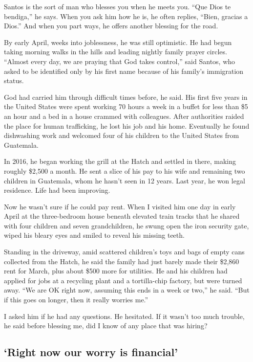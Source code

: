 Santos is the sort of man who blesses you when he meets you. ``Que Dios
te bendiga,'' he says. When you ask him how he is, he often replies,
``Bien, gracias a Dios.'' And when you part ways, he offers another
blessing for the road.

By early April, weeks into joblessness, he was still optimistic. He had
begun taking morning walks in the hills and leading nightly family
prayer circles. ``Almost every day, we are praying that God takes
control,'' said Santos, who asked to be identified only by his first
name because of his family's immigration status.

God had carried him through difficult times before, he said. His first
five years in the United States were spent working 70 hours a week in a
buffet for less than \$5 an hour and a bed in a house crammed with
colleagues. After authorities raided the place for human trafficking, he
lost his job and his home. Eventually he found dishwashing work and
welcomed four of his children to the United States from Guatemala.

In 2016, he began working the grill at the Hatch and settled in there,
making roughly \$2,500 a month. He sent a slice of his pay to his wife
and remaining two children in Guatemala, whom he hasn't seen in 12
years. Last year, he won legal residence. Life had been improving.

Now he wasn't sure if he could pay rent. When I visited him one day in
early April at the three-bedroom house beneath elevated train tracks
that he shared with four children and seven grandchildren, he swung open
the iron security gate, wiped his bleary eyes and smiled to reveal his
missing teeth.

Standing in the driveway, amid scattered children's toys and bags of
empty cans collected from the Hatch, he said the family had just barely
made their \$2,860 rent for March, plus about \$500 more for utilities.
He and his children had applied for jobs at a recycling plant and a
tortilla-chip factory, but were turned away. ``We are OK right now,
assuming this ends in a week or two,'' he said. ``But if this goes on
longer, then it really worries me.''

I asked him if he had any questions. He hesitated. If it wasn't too much
trouble, he said before blessing me, did I know of any place that was
hiring?

\hypertarget{right-now-our-worry-is-financial}{%
\subsection{`Right now our worry is
financial'}\label{right-now-our-worry-is-financial}}

